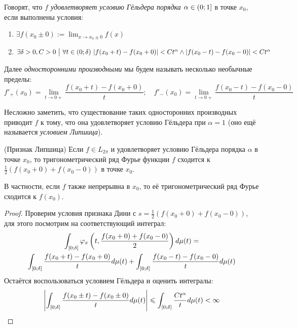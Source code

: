 \begin{definition}
	Говорят, что \textit{$f$ удовлетворяет условию Гёльдера порядка $\alpha \in \left(0; 1\right]$} в точке $x_0$, если выполнены условия:
	\begin{enumerate}
		\item $\exists f(x_0 \pm 0) := \lim_{x \to x_0 \pm 0} f(x)$
		
		\item $\exists \delta > 0, C > 0 \ \big|\  \forall t \in (0; \delta)\ |f(x_0 + t) - f(x_0 + 0)| < Ct^\alpha \wedge |f(x_0 - t) - f(x_0 - 0)| < Ct^\alpha$
	\end{enumerate}
\end{definition}

\begin{definition}
	Далее \textit{односторонними производными} мы будем называть несколько необычные пределы:
	\[
		f'_+(x_0) = \lim_{t \to 0+} \frac{f(x_0 + t) - f(x_0 + 0)}{t}; \quad f'_-(x_0) = \lim_{t \to 0+} \frac{f(x_0 - t) - f(x_0 - 0)}{t}
	\]
\end{definition}

\begin{note}
	Несложно заметить, что существование таких односторонних производных приводит $f$ к тому, что она удовлетворяет условию Гёльдера при $\alpha = 1$ (оно ещё называется \textit{условием Липшица}).
\end{note}

\begin{theorem} (Признак Липшица)
	Если $f \in L_{2\pi}$ и удовлетворяет условию Гёльдера порядка $\alpha$ в точке $x_0$, то тригонометрический ряд Фурье функции $f$ сходится к $\frac{1}{2}(f(x_0 + 0) + f(x_0 - 0))$ в точке $x_0$.
\end{theorem}

\begin{note}
	В частности, если $f$ также непрерывна в $x_0$, то её тригонометрический ряд Фурье сходится к $f(x_0)$.
\end{note}

\begin{proof}
	Проверим условия признака Дини с $s = \frac{1}{2}(f(x_0 + 0) + f(x_0 - 0))$, для этого посмотрим на соответствующий интеграл:
	\begin{multline*}
		\int_{[0; \delta]} \varphi_x\left(t, \frac{f(x_0 + 0) + f(x_0 - 0)}{2}\right)d\mu(t) =
		\\
		\int_{[0; \delta]} \frac{f(x_0 + t) - f(x_0 + 0)}{t}d\mu(t) + \int_{[0; \delta]} \frac{f(x_0 - t) - f(x_0 - 0)}{t}d\mu(t)
	\end{multline*}
	Остаётся воспользоваться условием Гёльдера и оценить интегралы:
	\[
		\left|\int_{[0; \delta]} \frac{f(x_0 \pm t) - f(x_0 \pm 0)}{t}d\mu(t)\right| \leqslant \int_{[0; \delta]} \frac{Ct^\alpha}{t}d\mu(t) < \infty
	\]
\end{proof}

